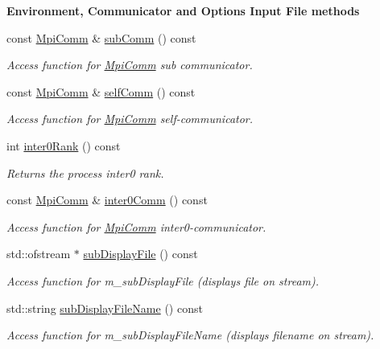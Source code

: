 \begin{Indent}{\bf Environment, Communicator and Options Input File methods}
\begin{DoxyCompactItemize}
const \hyperlink{class_q_u_e_s_o_1_1_mpi_comm}{Mpi\-Comm} \& \hyperlink{class_q_u_e_s_o_1_1_base_environment_affe39f53e3d5d678842413370af09145}{sub\-Comm} () const 
\begin{DoxyCompactList}\small\item\em Access function for \hyperlink{class_q_u_e_s_o_1_1_mpi_comm}{Mpi\-Comm} sub communicator. \end{DoxyCompactList}\item 
const \hyperlink{class_q_u_e_s_o_1_1_mpi_comm}{Mpi\-Comm} \& \hyperlink{class_q_u_e_s_o_1_1_base_environment_a824458f0d045db251d982ad4c75a4b76}{self\-Comm} () const 
\begin{DoxyCompactList}\small\item\em Access function for \hyperlink{class_q_u_e_s_o_1_1_mpi_comm}{Mpi\-Comm} self-\/communicator. \end{DoxyCompactList}\item 
int \hyperlink{class_q_u_e_s_o_1_1_base_environment_ae106b5bb8a80b655b88b3a26b1e7c185}{inter0\-Rank} () const 
\begin{DoxyCompactList}\small\item\em Returns the process inter0 rank. \end{DoxyCompactList}\item 
const \hyperlink{class_q_u_e_s_o_1_1_mpi_comm}{Mpi\-Comm} \& \hyperlink{class_q_u_e_s_o_1_1_base_environment_a689e4d140c74d495d97eb498714a4b82}{inter0\-Comm} () const 
\begin{DoxyCompactList}\small\item\em Access function for \hyperlink{class_q_u_e_s_o_1_1_mpi_comm}{Mpi\-Comm} inter0-\/communicator. \end{DoxyCompactList}\item 
std\-::ofstream $\ast$ \hyperlink{class_q_u_e_s_o_1_1_base_environment_a8a0064746ae8dddfece4229b9ad374d6}{sub\-Display\-File} () const 
\begin{DoxyCompactList}\small\item\em Access function for m\-\_\-sub\-Display\-File (displays file on stream). \end{DoxyCompactList}\item 
std\-::string \hyperlink{class_q_u_e_s_o_1_1_base_environment_a0c4361613213ab1412248f99e046281d}{sub\-Display\-File\-Name} () const 
\begin{DoxyCompactList}\small\item\em Access function for m\-\_\-sub\-Display\-File\-Name (displays filename on stream). \end{DoxyCompactList}\item 

\end{DoxyCompactItemize}
\end{Indent}
